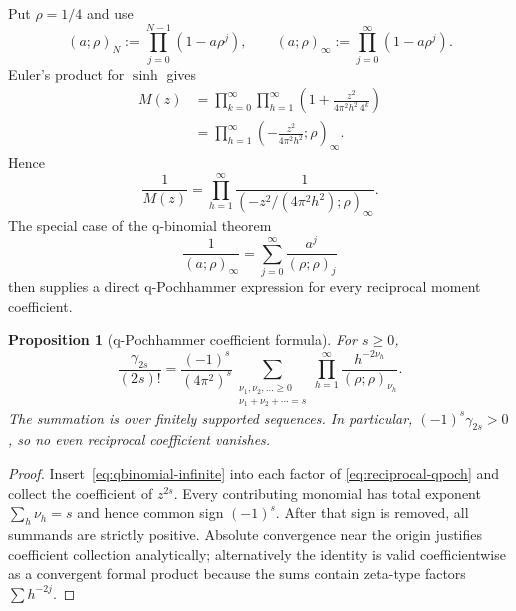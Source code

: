 \documentclass[11pt,a4paper]{article}
\newtheorem{proposition}[theorem]{Proposition}
\theoremstyle{remark}
\begin{document}
Put $\rho=1/4$ and use
\begin{equation}
 (a;\rho)_N:=\prod_{j=0}^{N-1}(1-a\rho^j),
 \qquad
 (a;\rho)_\infty:=\prod_{j=0}^{\infty}(1-a\rho^j).
 \label{eq:qpoch-definition}
\end{equation}
Euler's product for $\sinh$ gives
\begin{align}
 M(z)
 &=\prod_{k=0}^{\infty}\prod_{h=1}^{\infty}
 \left(1+\frac{z^2}{4\pi^2h^2\,4^k}\right)\\
 &=\prod_{h=1}^{\infty}
 \left(-\frac{z^2}{4\pi^2h^2};\rho\right)_\infty.
 \label{eq:mgf-qpoch}
\end{align}
Hence
\begin{equation}
 \boxed{
 \frac1{M(z)}=
 \prod_{h=1}^{\infty}
 \frac1{\left(-z^2/(4\pi^2h^2);\rho\right)_\infty}. }
 \label{eq:reciprocal-qpoch}
\end{equation}
The special case of the q-binomial theorem
\begin{equation}
 \frac1{(a;\rho)_\infty}
 =\sum_{j=0}^{\infty}\frac{a^j}{(\rho;\rho)_j}
 \label{eq:qbinomial-infinite}
\end{equation}
then supplies a direct q-Pochhammer expression for every reciprocal moment
coefficient.

\begin{proposition}[q-Pochhammer coefficient formula]
\label{prop:gamma-qpoch}
For $s\ge0$,
\begin{equation}
 \boxed{
 \frac{\gamma_{2s}}{(2s)!}
 =\frac{(-1)^s}{(4\pi^2)^s}
 \sum_{\substack{\nu_1,\nu_2,\ldots\ge0\\
                  \nu_1+\nu_2+\cdots=s}}
 \prod_{h=1}^{\infty}
 \frac{h^{-2\nu_h}}{(\rho;\rho)_{\nu_h}}. }
 \label{eq:gamma-qpoch-coefficient}
\end{equation}
The summation is over finitely supported sequences.  In particular,
$(-1)^s\gamma_{2s}>0$, so no even reciprocal coefficient vanishes.
\end{proposition}

\begin{proof}
Insert~\eqref{eq:qbinomial-infinite} into each factor of
\eqref{eq:reciprocal-qpoch} and collect the coefficient of $z^{2s}$.
Every contributing monomial has total exponent
$\sum_h\nu_h=s$ and hence common sign $(-1)^s$.  After that sign is removed,
all summands are strictly positive.  Absolute convergence near the origin
justifies coefficient collection analytically; alternatively the identity is
valid coefficientwise as a convergent formal product because the sums contain
zeta-type factors $\sum h^{-2j}$.
\end{proof}
\end{document}
